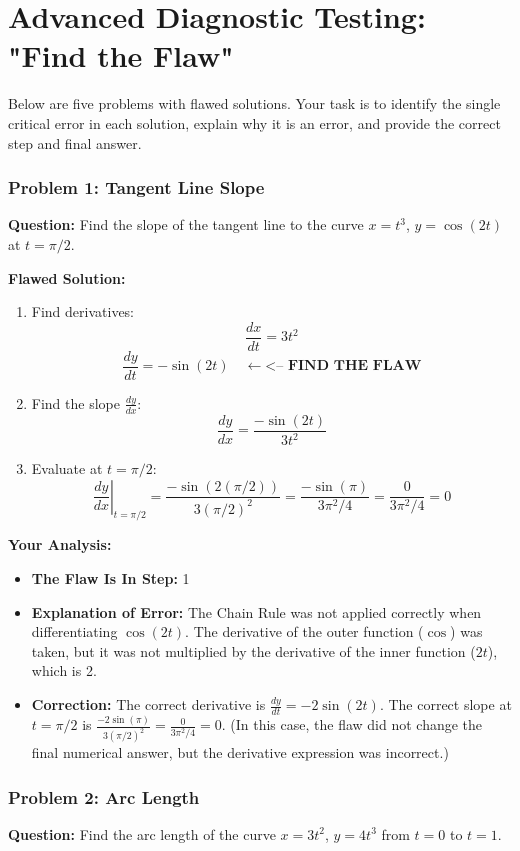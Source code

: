 \documentclass{article}
\begin{document}
\part{Advanced Diagnostic Testing: "Find the Flaw"}
Below are five problems with flawed solutions. Your task is to identify the single critical error in each solution, explain why it is an error, and provide the correct step and final answer.

\section{Problem 1: Tangent Line Slope}
\textbf{Question:} Find the slope of the tangent line to the curve $x = t^3$, $y = \cos(2t)$ at $t=\pi/2$.

\textbf{Flawed Solution:}
\begin{enumerate}
    \item Find derivatives:
    \[ \frac{dx}{dt} = 3t^2 \]
    \[ \frac{dy}{dt} = -\sin(2t) \quad \longleftarrow \textbf{<-- FIND THE FLAW} \]
    \item Find the slope $\frac{dy}{dx}$:
    \[ \frac{dy}{dx} = \frac{-\sin(2t)}{3t^2} \]
    \item Evaluate at $t=\pi/2$:
    \[ \left.\frac{dy}{dx}\right|_{t=\pi/2} = \frac{-\sin(2(\pi/2))}{3(\pi/2)^2} = \frac{-\sin(\pi)}{3\pi^2/4} = \frac{0}{3\pi^2/4} = 0 \]
\end{enumerate}
\textbf{Your Analysis:}
\begin{itemize}
    \item \textbf{The Flaw Is In Step:} 1
    \item \textbf{Explanation of Error:} The Chain Rule was not applied correctly when differentiating $\cos(2t)$. The derivative of the outer function ($\cos$) was taken, but it was not multiplied by the derivative of the inner function ($2t$), which is 2.
    \item \textbf{Correction:}
    The correct derivative is $\frac{dy}{dt} = -2\sin(2t)$.
    The correct slope at $t=\pi/2$ is $\frac{-2\sin(\pi)}{3(\pi/2)^2} = \frac{0}{3\pi^2/4} = 0$.
    (In this case, the flaw did not change the final numerical answer, but the derivative expression was incorrect.)
\end{itemize}

\section{Problem 2: Arc Length}
\textbf{Question:} Find the arc length of the curve $x = 3t^2$, $y=4t^3$ from $t=0$ to $t=1$.
\end{document}
